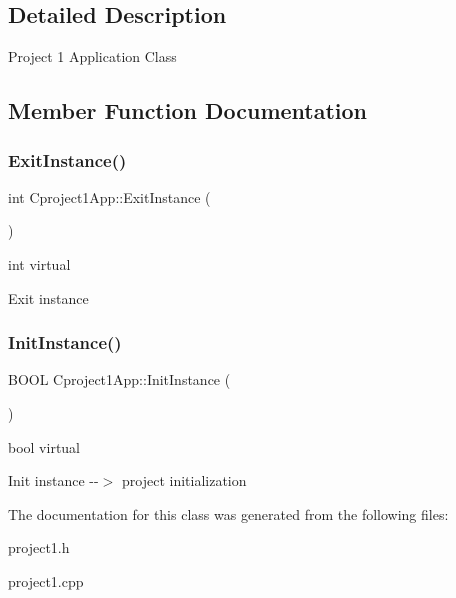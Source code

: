 \subsection{Detailed Description}
Project 1 Application Class 

\subsection{Member Function Documentation}
\mbox{\label{class_cproject1_app_a56e9ef8e5859a07840d9a9e90ca329b0}} 
\subsubsection{\texorpdfstring{ExitInstance()}{ExitInstance()}}
{\footnotesize\ttfamily int Cproject1\+App\+::\+Exit\+Instance (\begin{DoxyParamCaption}{ }\end{DoxyParamCaption})\hspace{0.3cm}{\ttfamily [virtual]}}



int virtual 

Exit instance \mbox{\label{class_cproject1_app_ace47920b20e0bf1d79d42b1ce03025ba}} 
\subsubsection{\texorpdfstring{InitInstance()}{InitInstance()}}
{\footnotesize\ttfamily B\+O\+OL Cproject1\+App\+::\+Init\+Instance (\begin{DoxyParamCaption}{ }\end{DoxyParamCaption})\hspace{0.3cm}{\ttfamily [virtual]}}



bool virtual 

Init instance -\/-\/$>$ project initialization 

The documentation for this class was generated from the following files\+:\begin{DoxyCompactItemize}
\item 
project1.\+h\item 
project1.\+cpp\end{DoxyCompactItemize}
